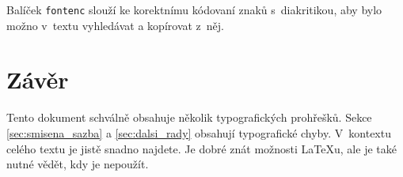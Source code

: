 \documentclass[a4paper, twocolumn, 10pt]{article}
\begin{document}
    Balíček \texttt{fontenc} slouží ke korektnímu kódovaní znaků s~diakritikou, aby bylo možno v~textu vyhledávat a kopírovat z~něj.
    
\section{Závěr}
    Tento dokument schválně obsahuje několik typografických prohřešků. Sekce \ref{sec:smisena_sazba} a \ref{sec:dalsi_rady} obsahují typografické chyby. V~kontextu celého textu je jistě snadno najdete. Je dobré znát možnosti \LaTeX u, ale je také nutné vědět, kdy je nepoužít.
    
\end{document}
